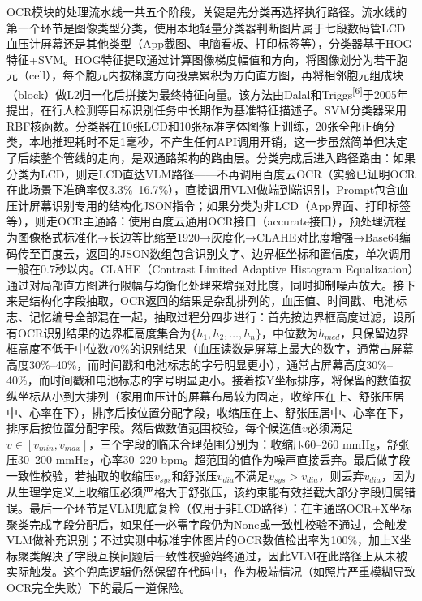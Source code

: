 \documentclass[zihao=-4,a4paper]{ctexart}
\numberwithin{figure}{section}
\numberwithin{table}{section}
\begin{document}
OCR模块的处理流水线一共五个阶段，关键是先分类再选择执行路径。流水线的第一个环节是图像类型分类，使用本地轻量分类器判断图片属于七段数码管LCD血压计屏幕还是其他类型（App截图、电脑看板、打印标签等），分类器基于HOG特征+SVM。HOG特征提取通过计算图像梯度幅值和方向，将图像划分为若干胞元（cell），每个胞元内按梯度方向投票累积为方向直方图，再将相邻胞元组成块（block）做L2归一化后拼接为最终特征向量。该方法由Dalal和Triggs\textsuperscript{[6]}于2005年提出，在行人检测等目标识别任务中长期作为基准特征描述子。SVM分类器采用RBF核函数。分类器在10张LCD和10张标准字体图像上训练，20张全部正确分类，本地推理耗时不足1毫秒，不产生任何API调用开销，这一步虽然简单但决定了后续整个管线的走向，是双通路架构的路由层。分类完成后进入路径路由：如果分类为LCD，则走LCD直达VLM路径——不再调用百度云OCR（实验已证明OCR在此场景下准确率仅3.3\%--16.7\%），直接调用VLM做端到端识别，Prompt包含血压计屏幕识别专用的结构化JSON指令；如果分类为非LCD（App界面、打印标签等），则走OCR主通路：使用百度云通用OCR接口（accurate接口），预处理流程为图像格式标准化→长边等比缩至1920→灰度化→CLAHE对比度增强→Base64编码传至百度云，返回的JSON数组包含识别文字、边界框坐标和置信度，单次调用一般在0.7秒以内。CLAHE（Contrast Limited Adaptive Histogram Equalization）通过对局部直方图进行限幅与均衡化处理来增强对比度，同时抑制噪声放大。接下来是结构化字段抽取，OCR返回的结果是杂乱排列的，血压值、时间戳、电池标志、记忆编号全部混在一起，抽取过程分四步进行：首先按边界框高度过滤，设所有OCR识别结果的边界框高度集合为$\{h_1, h_2, \ldots, h_n\}$，中位数为$h_{med}$，只保留边界框高度不低于中位数70\%的识别结果（血压读数是屏幕上最大的数字，通常占屏幕高度30\%--40\%，而时间戳和电池标志的字号明显更小），通常占屏幕高度30\%--40\%，而时间戳和电池标志的字号明显更小。接着按Y坐标排序，将保留的数值按纵坐标从小到大排列（家用血压计的屏幕布局较为固定，收缩压在上、舒张压居中、心率在下），排序后按位置分配字段，收缩压在上、舒张压居中、心率在下，排序后按位置分配字段。然后做数值范围校验，每个候选值$v$必须满足$v \in [v_{min}, v_{max}]$，三个字段的临床合理范围分别为：收缩压60--260 mmHg，舒张压30--200 mmHg，心率30--220 bpm。超范围的值作为噪声直接丢弃。最后做字段一致性校验，若抽取的收缩压$v_{sys}$和舒张压$v_{dia}$不满足$v_{sys} > v_{dia}$，则丢弃$v_{dia}$，因为从生理学定义上收缩压必须严格大于舒张压，该约束能有效拦截大部分字段归属错误。最后一个环节是VLM兜底复检（仅用于非LCD路径）：在主通路OCR+X坐标聚类完成字段分配后，如果任一必需字段仍为None或一致性校验不通过，会触发VLM做补充识别；不过实测中标准字体图片的OCR数值检出率为100\%，加上X坐标聚类解决了字段互换问题后一致性校验始终通过，因此VLM在此路径上从未被实际触发。这个兜底逻辑仍然保留在代码中，作为极端情况（如照片严重模糊导致OCR完全失败）下的最后一道保险。
\end{document}
